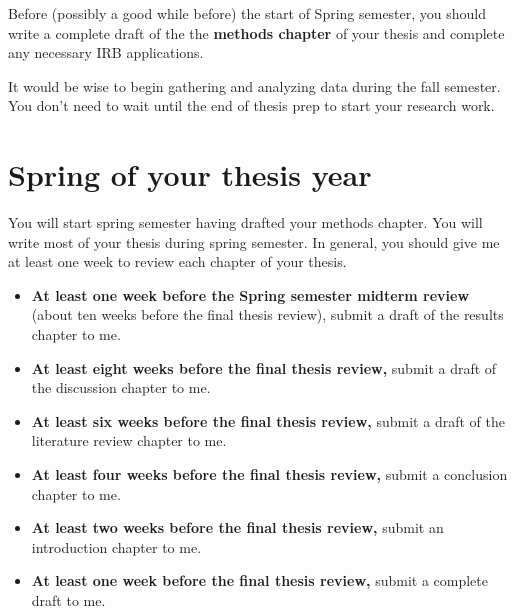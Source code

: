 \documentclass[]{tufte-book}
\begin{document}
Before (possibly a good while before) the start of Spring semester, you should write a complete draft of the the \textbf{methods chapter} of your thesis and complete any necessary IRB applications.

It would be wise to begin gathering and analyzing data during the fall semester. You don't need to wait until the end of thesis prep to start your research work.

\hypertarget{spring-of-your-thesis-year}{%
\section{Spring of your thesis year}\label{spring-of-your-thesis-year}}

You will start spring semester having drafted your methods chapter. You will write most of your thesis during spring semester. In general, you should give me at least one week to review each chapter of your thesis.

\begin{itemize}
\item
  \textbf{At least one week before the Spring semester midterm review} (about ten weeks before the final thesis review), submit a draft of the results chapter to me.
\item
  \textbf{At least eight weeks before the final thesis review,} submit a draft of the discussion chapter to me.
\item
  \textbf{At least six weeks before the final thesis review,} submit a draft of the literature review chapter to me.
\item
  \textbf{At least four weeks before the final thesis review,} submit a conclusion chapter to me.
\item
  \textbf{At least two weeks before the final thesis review,} submit an introduction chapter to me.
\item
  \textbf{At least one week before the final thesis review,} submit a complete draft to me.
\end{itemize}


\end{document}
